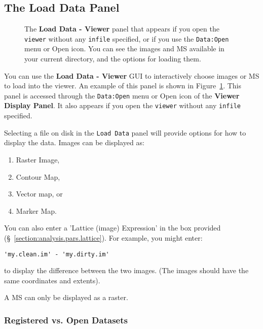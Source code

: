 
\subsection{The Load Data Panel}
\label{section:display.viewerGUI.load}

\begin{figure}[h!]
\begin{center}
\caption{\label{fig:viewer_load} The {\bf Load Data - Viewer} panel
that appears if you open the {\tt viewer} without any {\tt infile}
specified, or if you use the {\tt Data:Open} menu or Open icon.
You can see the images and MS available in your current directory,
and the options for loading them.} 
\hrulefill
\end{center}
\end{figure}

You can use the {\bf Load Data - Viewer} GUI to interactively
choose images or MS to load into the viewer.  An example of
this panel is shown in Figure~\ref{fig:viewer_load}.  This
panel is accessed through the {\tt Data:Open} menu or Open icon
of the {\bf Viewer Display Panel}.  It also appears if you open 
the {\tt viewer} without any {\tt infile} specified.

Selecting a file on disk in the {\tt Load Data} panel will
provide options for how to display the data. Images can be displayed
as: 
\begin{enumerate}
\item Raster Image, 
\item Contour Map, 
\item Vector map, or 
\item Marker Map.  
\end{enumerate}

You can also enter a 'Lattice (image) Expression' in the box provided
(\S~\ref{section:analysis.pars.lattice}).  For example, you might enter:

\begin{verbatim}
'my.clean.im' - 'my.dirty.im'
\end{verbatim}

to display the difference between the two images.  (The images should
have the same coordinates and extents).

A MS can only be displayed as a raster.


\subsubsection{Registered vs. Open Datasets}
\label{section:display.viewerGUI.load.register}


